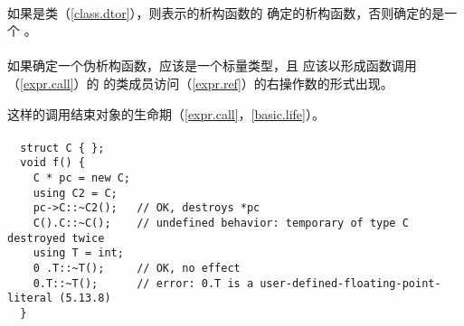 \paragraph{} %
如果是类（\ref{class.dtor}），则表示的析构函数的
确定的析构函数，否则确定的是一个
。

\paragraph{} %
如果确定一个伪析构函数，应该是一个标量类型，且
应该以形成函数调用（\ref{expr.call}）的
的类成员访问（\ref{expr.ref}）的右操作数的形式出现。

\begin{note}
  这样的调用结束对象的生命期（\ref{expr.call}，\ref{basic.life}）。
\end{note}

\newpage

\paragraph{} %
\begin{example}
  \begin{lstlisting}
  struct C { };
  void f() {
    C * pc = new C;
    using C2 = C;
    pc->C::~C2();   // OK, destroys *pc
    C().C::~C();    // undefined behavior: temporary of type C destroyed twice
    using T = int;
    0 .T::~T();     // OK, no effect
    0.T::~T();      // error: 0.T is a user-defined-floating-point-literal (5.13.8)
  }
  \end{lstlisting}
\end{example}
